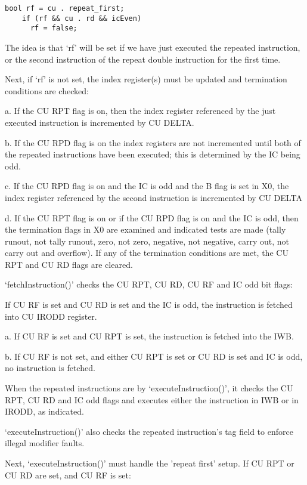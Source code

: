 \documentclass[notitlepage]{report}
\begin{document}
\begin{verbatim}
bool rf = cu . repeat_first;
    if (rf && cu . rd && icEven)
      rf = false;
\end{verbatim}

The idea is that `rf' will be set if we have just executed the repeated instruction, or the 
second instruction of the repeat double instruction for the first time.

Next, if `rf' is not set, the index register(s) must be updated and termination
conditions are checked:

a. If the CU RPT flag is on, then the index register referenced by the just executed instruction 
is incremented by CU DELTA.

b. If the CU RPD flag is on the index registers are not incremented until both of the 
repeated instructions have been executed; this is determined by the IC being odd.

c. If the CU RPD flag is on and the IC is odd and the B flag is set in X0, the index
register referenced by the second instruction is incremented by CU DELTA 

d. If the CU RPT flag is on or if the CU RPD flag is on and the IC is odd, then the 
termination flags in X0 are examined and indicated tests are made (tally runout, not
tally runout, zero, not zero, negative, not negative, carry out, not carry out and
overflow). If any of the termination conditions are met, the CU RPT and CU RD flags
are cleared.

`fetchInstruction()' checks the CU RPT, CU RD, CU RF and IC odd bit flags:

If CU RF is set and CU RD is set and the IC is odd, the instruction is fetched into
CU IRODD register.

a. If CU RF is set and CU RPT is set, the instruction is fetched into the IWB.

b. If CU RF is not set, and either CU RPT is set or CU RD is set and IC is odd, no instruction is fetched.

When the repeated instructions are by `executeInstruction()', it checks the CU RPT, CU RD and IC odd flags and executes either the instruction in IWB or in IRODD, as indicated.

`executeInstruction()' also checks the repeated instruction's tag field to enforce illegal
modifier faults.

Next, `executeInstruction()' must handle the 'repeat first' setup. If CU RPT or CU RD are set, and
CU RF is set:
\end{document}
